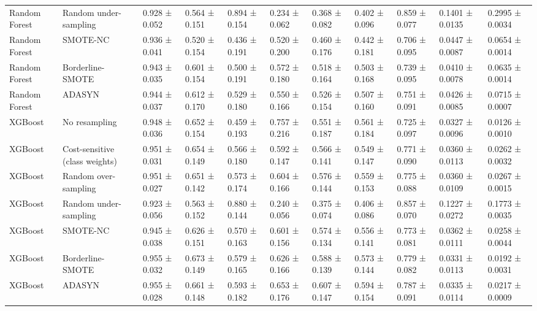 \begin{table}
\begin{tabular}{lllllllllll}
Random Forest & Random under-sampling & 0.928 ± 0.052 & 0.564 ± 0.151 & 0.894 ± 0.154 & 0.234 ± 0.062 & 0.368 ± 0.082 & 0.402 ± 0.096 & 0.859 ± 0.077 & 0.1401 ± 0.0135 & 0.2995 ± 0.0034 \\
Random Forest & SMOTE-NC & 0.936 ± 0.041 & 0.520 ± 0.154 & 0.436 ± 0.191 & 0.520 ± 0.200 & 0.460 ± 0.176 & 0.442 ± 0.181 & 0.706 ± 0.095 & 0.0447 ± 0.0087 & 0.0654 ± 0.0014 \\
Random Forest & Borderline-SMOTE & 0.943 ± 0.035 & 0.601 ± 0.154 & 0.500 ± 0.191 & 0.572 ± 0.180 & 0.518 ± 0.164 & 0.503 ± 0.168 & 0.739 ± 0.095 & 0.0410 ± 0.0078 & 0.0635 ± 0.0014 \\
Random Forest & ADASYN & 0.944 ± 0.037 & 0.612 ± 0.170 & 0.529 ± 0.180 & 0.550 ± 0.166 & 0.526 ± 0.154 & 0.507 ± 0.160 & 0.751 ± 0.091 & 0.0426 ± 0.0085 & 0.0715 ± 0.0007 \\
XGBoost & No resampling & 0.948 ± 0.036 & 0.652 ± 0.154 & 0.459 ± 0.193 & 0.757 ± 0.216 & 0.551 ± 0.187 & 0.561 ± 0.184 & 0.725 ± 0.097 & 0.0327 ± 0.0096 & 0.0126 ± 0.0010 \\
XGBoost & Cost-sensitive (class weights) & 0.951 ± 0.031 & 0.654 ± 0.149 & 0.566 ± 0.180 & 0.592 ± 0.147 & 0.566 ± 0.141 & 0.549 ± 0.147 & 0.771 ± 0.090 & 0.0360 ± 0.0113 & 0.0262 ± 0.0032 \\
XGBoost & Random over-sampling & 0.951 ± 0.027 & 0.651 ± 0.142 & 0.573 ± 0.174 & 0.604 ± 0.166 & 0.576 ± 0.144 & 0.559 ± 0.153 & 0.775 ± 0.088 & 0.0360 ± 0.0109 & 0.0267 ± 0.0015 \\
XGBoost & Random under-sampling & 0.923 ± 0.056 & 0.563 ± 0.152 & 0.880 ± 0.144 & 0.240 ± 0.056 & 0.375 ± 0.074 & 0.406 ± 0.086 & 0.857 ± 0.070 & 0.1227 ± 0.0272 & 0.1773 ± 0.0035 \\
XGBoost & SMOTE-NC & 0.945 ± 0.038 & 0.626 ± 0.151 & 0.570 ± 0.163 & 0.601 ± 0.156 & 0.574 ± 0.134 & 0.556 ± 0.141 & 0.773 ± 0.081 & 0.0362 ± 0.0111 & 0.0258 ± 0.0044 \\
XGBoost & Borderline-SMOTE & 0.955 ± 0.032 & 0.673 ± 0.149 & 0.579 ± 0.165 & 0.626 ± 0.166 & 0.588 ± 0.139 & 0.573 ± 0.144 & 0.779 ± 0.082 & 0.0331 ± 0.0113 & 0.0192 ± 0.0031 \\
XGBoost & ADASYN & 0.955 ± 0.028 & 0.661 ± 0.148 & 0.593 ± 0.182 & 0.653 ± 0.176 & 0.607 ± 0.147 & 0.594 ± 0.154 & 0.787 ± 0.091 & 0.0335 ± 0.0114 & 0.0217 ± 0.0009 \\
\bottomrule
\end{tabular}
\end{table}
